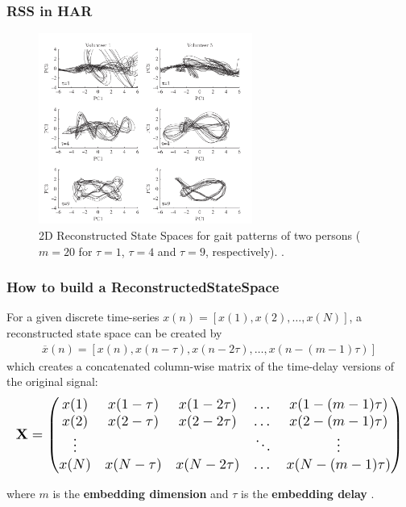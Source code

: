 \documentclass{beamer}
\begin{document}
\begin{frame}
\frametitle{RSS in HAR}
\vspace{-0.7cm}

\begin{figure}[!htb]
\centering
\includegraphics[width=0.625\textwidth]{sama_2013}
\caption[PA]{2D Reconstructed State Spaces for gait patterns of two persons ($m=20$ for $\tau=1$, $\tau=4$ and $\tau=9$, respectively).
 \textcolor{red}{\textbf{ \cite{Sama2013} }}.
}
\label{fig:sn}
\end{figure}



\end{frame}






\begin{frame}
\frametitle{How to build a ReconstructedStateSpace}


For a given discrete time-series $x(n) = [x(1) , x(2), \dots, x(N)]$,
a reconstructed state space can be created by
\begin{eqnarray*}
\overline{x}(n) = [ x(n), x(n - \tau), x(n-2\tau), \dots , x (n-(m-1)\tau) ]
\end{eqnarray*}
which creates a concatenated column-wise matrix of the time-delay versions of the original signal:
\begin{equation}
  \resizebox{\textwidth}{!}{$\displaystyle
  \mathbf{X}
    = \begin{pmatrix} \nonumber
      x(1) & x(1 - \tau) & x(1-2\tau) & \dots & x (1-(m-1)\tau) \\
      x(2) & x(2 - \tau) & x(2-2\tau) & \dots & x (2-(m-1)\tau) \\
      \vdots &  &  & \ddots & \vdots \\
      x(N) & x(N - \tau) & x(N-2\tau) & \dots & x (N-(m-1)\tau) \\
      \end{pmatrix}
     $}
\end{equation}



where $m$ is the \textbf{ embedding dimension}  and  $\tau$ is the \textbf{ embedding delay}
\textcolor{red}{\textbf{  \cite{Takens1981} }}.


\end{frame}
\end{document}
